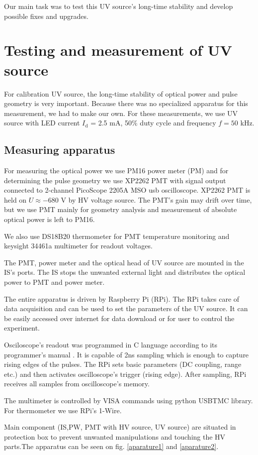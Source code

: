 Our main task was to test this UV source's long-time stability and develop possible fixes and upgrades.


\section{Testing and measurement of UV source}
For calibration UV source, the long-time stability of optical power and pulse geometry is very important. Because there was no specialized apparatus for this measurement, we had to make our own. For these measurements, we use UV source with LED current $I_{\textrm{d}}$ = 2.5 mA, 50$\%$ duty cycle and frequency $f = 50$ kHz. 
\subsection{Measuring apparatus}
For measuring the optical power we use PM16 power meter (PM) and for determining the pulse geometry we use XP2262 PMT with signal output connected to 2-channel PicoScope 2205A MSO usb oscilloscope. XP2262 PMT is held on $U \approx -680$ V by HV voltage source. The PMT's gain may drift over time, but we use PMT mainly for geometry analysis and measurement of absolute optical power is left to PM16.
\par
We also use DS18B20 thermometer for PMT temperature monitoring and keysight 34461a multimeter for readout voltages.

\par
The PMT, power meter and the optical head of UV source are mounted in the IS's ports. The IS stops the unwanted external light and distributes the optical power to PMT and power meter. 
\par
The entire apparatus is driven by Raspberry Pi (RPi). The RPi takes care of data acquisition and can be used to set the parameters of the UV source. It can be easily accessed over internet for data download or for user to control the experiment.
\par
Osciloscope's readout was programmed in C language according to its programmer's manual \cite{PicoScope}. It is capable of 2ns sampling which is enough to capture rising edges of the pulses. The RPi sets basic parameters (DC coupling, range etc.) and then activates oscilloscope's trigger (rising edge). After sampling, RPi receives all samples from oscilloscope's memory.
\par
The multimeter is controlled by VISA commands using python USBTMC library. For thermometer we use RPi's 1-Wire.
\par
Main component (IS,PW, PMT with HV source, UV source) are situated in protection box to prevent unwanted manipulations and touching the HV parts.The apparatus can be seen on fig. \ref{aparature1} and \ref{aparature2}.

